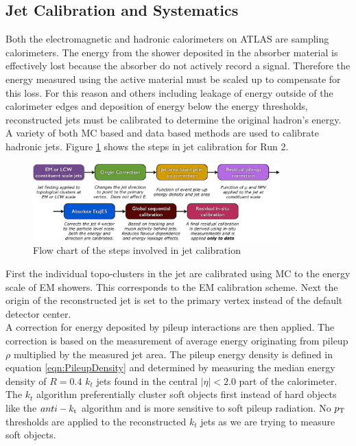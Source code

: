 \subsection{Jet Calibration and Systematics}
\label{sec:jet:calib}

\indent Both the electromagnetic and hadronic calorimeters on ATLAS are sampling calorimeters.  The energy from the shower deposited in the absorber material is effectively lost because the absorber do not actively record a signal.  Therefore the energy measured using the active material must be scaled up to compensate for this loss.  For this reason and others including leakage of energy outside of the calorimeter edges and deposition of energy below the energy thresholds, reconstructed jets must be calibrated to determine the original hadron's energy.  \\

\indent  A variety of both MC based and data based methods are used to calibrate hadronic jets.  Figure \ref{fig:jetCalibFlow} shows the steps in jet calibration for Run 2.\cite{Calibartion13TeV} \\

\begin{figure}[htb]
  \begin{center}
    \includegraphics[width=0.85\textwidth]{figures/JetCalib/JetCalibFlow.png}\hspace{0.05\textwidth}
\end{center}
\caption{Flow chart of the steps involved in jet calibration}
\label{fig:jetCalibFlow} 
\end{figure}

\indent First the individual topo-clusters in the jet are calibrated using MC to the energy scale of EM showers.\cite{topoCalib}  This corresponds to the EM calibration scheme.  Next the origin of the reconstructed jet is set to the primary vertex instead of the default detector center. \\

\indent A correction for energy deposited by pileup interactions are then applied.\cite{pileupsub}  The correction is based on the measurement of average energy originating from pileup $\rho$ multiplied by the measured jet area.  The pileup energy density is defined in equation \ref{eqn:PileupDensity} and determined by measuring the median energy density of $R=0.4$ $k_t$ jets found in the central $|\eta|<2.0$ part of the calorimeter.  The $k_t$ algorithm preferentially cluster soft objects first instead of hard objects like the $anti-k_{\rm{t}}$ algorithm and is more sensitive to soft pileup radiation.  No $p_{\mathrm{T}}$ thresholds are applied to the reconstructed $k_t$ jets as we are trying to measure soft objects.  \\

